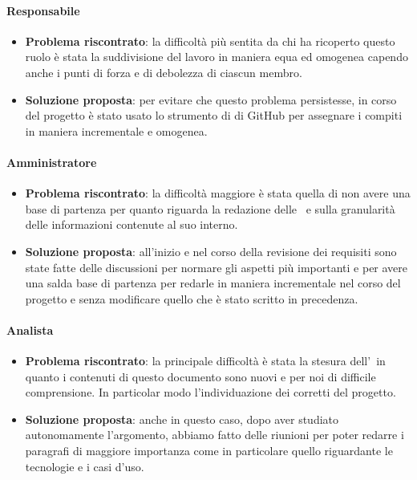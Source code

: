 		\paragraph{Responsabile}
			\begin{itemize}
				\item \textbf{Problema riscontrato}: la difficoltà più sentita da chi ha ricoperto questo ruolo è stata la suddivisione del lavoro in maniera equa ed omogenea capendo anche i punti di forza e di debolezza di ciascun membro.
				\item \textbf{Soluzione proposta}: per evitare che questo problema persistesse, in corso del progetto è stato usato lo strumento di  di GitHub per assegnare i compiti in maniera incrementale e omogenea.
			\end{itemize}

		\paragraph{Amministratore}
			\begin{itemize}
				\item \textbf{Problema riscontrato}: la difficoltà maggiore è stata quella di non avere una base di partenza per quanto riguarda la redazione delle \NdP\ e sulla granularità delle informazioni contenute al suo interno.
				\item \textbf{Soluzione proposta}: all'inizio e nel corso della revisione dei requisiti sono state fatte delle discussioni per normare gli aspetti più importanti e per avere una salda base di partenza per redarle in maniera incrementale nel corso del progetto e senza modificare quello che è stato scritto in precedenza.
			\end{itemize}

		\paragraph{Analista}
			\begin{itemize}
				\item \textbf{Problema riscontrato}: la principale difficoltà è stata la stesura dell'\AdR\ in quanto i contenuti di questo documento sono nuovi e per noi di difficile comprensione. In particolar modo l'individuazione dei corretti  del progetto.
				\item \textbf{Soluzione proposta}: anche in questo caso, dopo aver studiato autonomamente l'argomento, abbiamo fatto delle riunioni per poter redarre i paragrafi di maggiore importanza come in particolare quello riguardante le tecnologie e i casi d'uso.
			\end{itemize}

